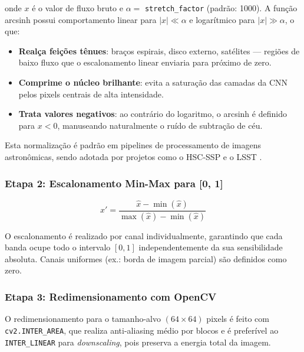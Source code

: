 \documentclass[12pt, a4paper]{article}
\begin{document}
onde $x$ é o valor de fluxo bruto e $\alpha = $ \texttt{stretch\_factor}
(padrão: 1000). A função arcsinh possui comportamento linear para $|x| \ll
\alpha$ e logarítmico para $|x| \gg \alpha$, o que:
\begin{itemize}[leftmargin=2em]
  \item \textbf{Realça feições tênues}: braços espirais, disco externo,
        satélites --- regiões de baixo fluxo que o escalonamento linear
        enviaria para próximo de zero.
  \item \textbf{Comprime o núcleo brilhante}: evita a saturação das camadas
        da CNN pelos pixels centrais de alta intensidade.
  \item \textbf{Trata valores negativos}: ao contrário do logaritmo, o arcsinh
        é definido para $x < 0$, manuseando naturalmente o ruído de subtração
        de céu.
\end{itemize}

Esta normalização é padrão em pipelines de processamento de imagens
astronômicas, sendo adotada por projetos como o HSC-SSP e o LSST
\cite{lupton2004}.

\subsubsection{Etapa 2: Escalonamento Min-Max para [0, 1]}

\begin{equation}
  x' = \frac{\hat{x} - \min(\hat{x})}{\max(\hat{x}) - \min(\hat{x})}
\end{equation}

O escalonamento é realizado por canal individualmente, garantindo que cada
banda ocupe todo o intervalo $[0, 1]$ independentemente da sua sensibilidade
absoluta. Canais uniformes (ex.: borda de imagem parcial) são definidos como
zero.

\subsubsection{Etapa 3: Redimensionamento com OpenCV}

O redimensionamento para o tamanho-alvo $(64 \times 64)$ pixels é feito com
\texttt{cv2.INTER\_AREA}, que realiza anti-aliasing médio por blocos e é
preferível ao \texttt{INTER\_LINEAR} para \textit{downscaling}, pois preserva
a energia total da imagem.
\end{document}
